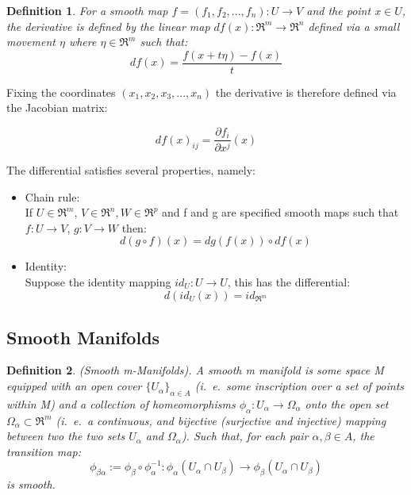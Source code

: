 \documentclass{article}
\newtheorem{definition}{Definition}
\begin{document}
\begin{definition}
    For a smooth map
    $f = (f_{1}, f_{2}, ..., f_{n}) : U \rightarrow V$ and the point $x \in U$, the derivative is defined by the linear map $df(x): \Re^{m} \rightarrow \Re^{n}$ defined via a small movement $\eta$ where $\eta \in \Re^{m}$ such that:
    $$df(x) = \frac{f(x + t\eta) - f(x)}{t}$$
\end{definition}

Fixing the coordinates $(x_1, x_2, x_3, ..., x_n)$ the derivative is therefore defined via the Jacobian matrix:

$$df(x)_{ij} = \frac{\partial f_{i}}{\partial x^{j}}(x)$$


The differential satisfies several properties, namely:

\begin{itemize}
    \item Chain rule: \\ If $U \in \Re^{m}$, $V \in \Re^{n}, W \in \Re^{p}$ and f and g are specified smooth maps such that $f: U \rightarrow V$, $g: V \rightarrow W$ then: 
    $$d(g \circ f) (x) = dg(f(x)) \circ df(x)$$

    \item Identity: \\
    Suppose the identity mapping $id_{U}: U \rightarrow U$, this has the differential:
    $$d(id_{U}(x)) = id_{\Re^{m}}$$
\end{itemize}

\subsection{Smooth Manifolds}

\begin{definition}
        (Smooth m-Manifolds). A smooth m manifold is some space M equipped with an open cover $\{U_{\alpha}\}_{\alpha \in A}$ (i.\ e.\ some inscription over a set of points within M) and a collection of homeomorphisms $\phi_{\alpha}: U_{\alpha} \rightarrow \Omega_{\alpha}$ onto the open set $\Omega_{\alpha} \subset \Re^{m}$ (i.\ e.\ a continuous, and bijective (surjective and injective) mapping between two the two sets $U_{\alpha}$ and $\Omega_{\alpha}$). Such that, for each pair $\alpha, \beta \in A$, the transition map: $$\phi_{\beta \alpha}:= \phi_{\beta}\circ\phi_{\alpha}^{-1}:\phi_{\alpha}(U_{\alpha}\cap U_{\beta})\rightarrow \phi_{\beta}(U_{\alpha}\cap U_{\beta})$$ is smooth.
\end{definition}
\end{document}
